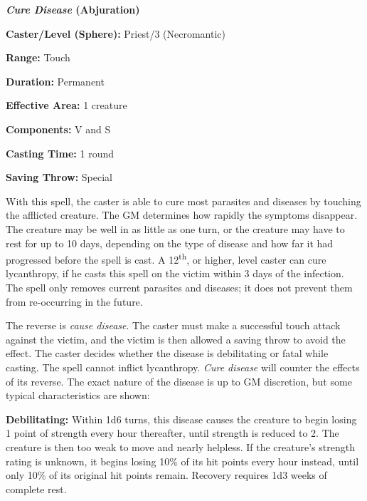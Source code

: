 \begin{multicols}{2}
\vspace{1em}

\noindent
\begin{minipage}{\columnwidth}

\noindent \textbf{\textit{Cure Disease} (Abjuration)}

\noindent \textbf{Caster/Level (Sphere):} Priest/3 (Necromantic)

\noindent \textbf{Range:} Touch

\noindent \textbf{Duration:} Permanent

\noindent \textbf{Effective Area:} 1 creature

\noindent \textbf{Components:} V and S

\noindent \textbf{Casting Time:} 1 round

\noindent \textbf{Saving Throw:} Special

\end{minipage}

With this spell, the caster is able to cure most parasites and diseases by touching the afflicted creature.  The GM determines how rapidly the symptoms disappear.  The creature may be well in as little as one turn, or the creature may have to rest for up to 10 days, depending on the type of disease and how far it had progressed before the spell is cast.  A 12\textsuperscript{th}, or higher, level caster can cure lycanthropy, if he casts this spell on the victim within 3 days of the infection.  The spell only removes current parasites and diseases; it does not prevent them from re-occurring in the future.  

The reverse is \textit{cause disease}.  The caster must make a successful touch attack against the victim, and the victim is then allowed a saving throw to avoid the effect.  The caster decides whether the disease is debilitating or fatal while casting.  The spell cannot inflict lycanthropy.  \textit{Cure disease} will counter the effects of its reverse.  The exact nature of the disease is up to GM discretion, but some typical characteristics are shown:

\textbf{Debilitating:} Within 1d6 turns, this disease causes the creature to begin losing 1 point of strength every hour thereafter, until strength is reduced to 2.  The creature is then too weak to move and nearly helpless.  If the creature's strength rating is unknown, it begins losing 10\% of its hit points every hour instead, until only 10\% of its original hit points remain.  Recovery requires 1d3 weeks of complete rest.


\end{multicols}
